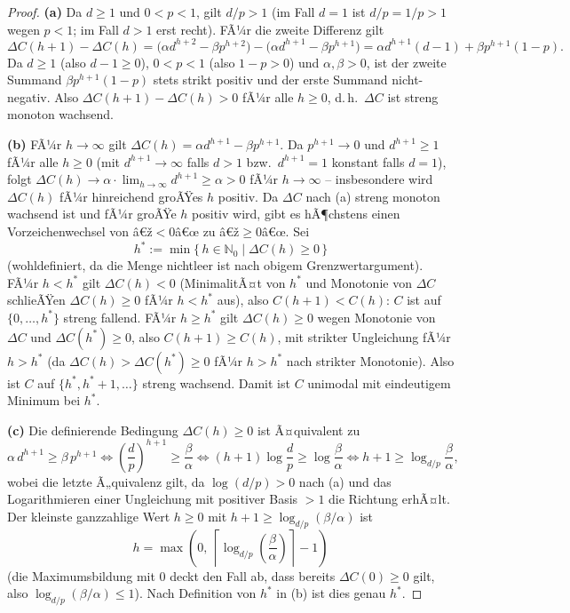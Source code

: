 ﻿\documentclass[a4paper,12pt]{article}
\theoremstyle{definition}
\begin{document}
\begin{proof}
	\textbf{(a)} Da $d\ge1$ und $0<p<1$, gilt $d/p>1$ (im Fall $d=1$ ist $d/p=1/p>1$
	wegen $p<1$; im Fall $d>1$ erst recht). FÃ¼r die zweite Differenz gilt
	\[
		\Delta C(h+1)-\Delta C(h)
		= \bigl(\alpha d^{h+2}-\beta p^{h+2}\bigr) - \bigl(\alpha d^{h+1}-\beta p^{h+1}\bigr)
		= \alpha d^{h+1}(d-1) + \beta p^{h+1}(1-p).
	\]
	Da $d\ge1$ (also $d-1\ge0$), $0<p<1$ (also $1-p>0$) und $\alpha,\beta>0$, ist der
	zweite Summand $\beta p^{h+1}(1-p)$ stets strikt positiv und der erste Summand
	nicht-negativ. Also $\Delta C(h+1)-\Delta C(h)>0$ fÃ¼r alle $h\ge0$, d.\,h.\ $\Delta C$
	ist streng monoton wachsend.

	\textbf{(b)} FÃ¼r $h\to\infty$ gilt $\Delta C(h)=\alpha d^{h+1}-\beta p^{h+1}$. Da
	$p^{h+1}\to0$ und $d^{h+1}\ge1$ fÃ¼r alle $h\ge0$ (mit $d^{h+1}\to\infty$ falls $d>1$
	bzw.\ $d^{h+1}=1$ konstant falls $d=1$), folgt $\Delta C(h)\to\alpha\cdot
	\lim_{h\to\infty}d^{h+1}\ge\alpha>0$ fÃ¼r $h\to\infty$ -- insbesondere wird
	$\Delta C(h)$ fÃ¼r hinreichend groÃŸes $h$ positiv. Da $\Delta C$ nach (a) streng
	monoton wachsend ist und fÃ¼r groÃŸe $h$ positiv wird, gibt es hÃ¶chstens einen
	Vorzeichenwechsel von â€ž$<0$â€œ zu â€ž$\ge0$â€œ. Sei
	\[
		h^\ast := \min\{\, h\in\mathbb{N}_0 \mid \Delta C(h)\ge0 \,\}
	\]
	(wohldefiniert, da die Menge nichtleer ist nach obigem Grenzwertargument). FÃ¼r
	$h<h^\ast$ gilt $\Delta C(h)<0$ (MinimalitÃ¤t von $h^\ast$ und Monotonie von
	$\Delta C$ schlieÃŸen $\Delta C(h)\ge0$ fÃ¼r $h<h^\ast$ aus), also
	$C(h+1)<C(h)$: $C$ ist auf $\{0,\ldots,h^\ast\}$ streng fallend. FÃ¼r $h\ge h^\ast$
	gilt $\Delta C(h)\ge0$ wegen Monotonie von $\Delta C$ und $\Delta C(h^\ast)\ge0$,
	also $C(h+1)\ge C(h)$, mit strikter Ungleichung fÃ¼r $h>h^\ast$ (da $\Delta C(h)>
	\Delta C(h^\ast)\ge0$ fÃ¼r $h>h^\ast$ nach strikter Monotonie). Also ist $C$ auf
	$\{h^\ast,h^\ast+1,\ldots\}$ streng wachsend. Damit ist $C$ unimodal mit eindeutigem
	Minimum bei $h^\ast$.

	\textbf{(c)} Die definierende Bedingung $\Delta C(h)\ge0$ ist Ã¤quivalent zu
	\[
		\alpha\,d^{h+1}\ge\beta\,p^{h+1}
		\iff \left(\frac{d}{p}\right)^{h+1}\ge\frac{\beta}{\alpha}
		\iff (h+1)\log\frac{d}{p}\ge\log\frac{\beta}{\alpha}
		\iff h+1\ge\log_{d/p}\frac{\beta}{\alpha},
	\]
	wobei die letzte Ã„quivalenz gilt, da $\log(d/p)>0$ nach (a) und das Logarithmieren
	einer Ungleichung mit positiver Basis $>1$ die Richtung erhÃ¤lt. Der kleinste
	ganzzahlige Wert $h\ge0$ mit $h+1\ge\log_{d/p}(\beta/\alpha)$ ist
	\[
		h = \max\!\left(0,\ \left\lceil\log_{d/p}\!\left(\frac{\beta}{\alpha}\right)\right\rceil-1\right)
	\]
	(die Maximumsbildung mit $0$ deckt den Fall ab, dass bereits $\Delta C(0)\ge0$ gilt,
	also $\log_{d/p}(\beta/\alpha)\le1$). Nach Definition von $h^\ast$ in (b) ist dies
	genau $h^\ast$. \qedhere
\end{proof}
\end{document}
